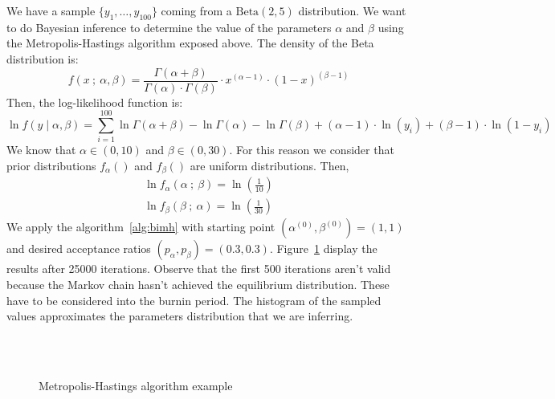 \documentclass[11pt,fleqn]{book} %
\begin{document}
\begin{example}
	We have a sample $\{y_1,\dots,y_{100}\}$ coming from a $\text{Beta}(2,5)$ 
	distribution. We want to do Bayesian inference to determine the value of the 
	parameters $\alpha$ and $\beta$ using the Metropolis-Hastings algorithm exposed 
	above. The density of the Beta distribution is:
	\begin{displaymath}
		f(x\ ;\ \alpha, \beta) = 
		\frac{\Gamma(\alpha+\beta)}{\Gamma(\alpha) \cdot \Gamma(\beta)} 
		\cdot x^{(\alpha-1)} \cdot (1-x)^{(\beta-1)}
	\end{displaymath}
	Then, the log-likelihood function is:
	\begin{displaymath}
		\ln f(y \mid \alpha, \beta) = 
		\displaystyle \sum_{i=1}^{100} 
		\ln \Gamma(\alpha+\beta) - \ln \Gamma(\alpha) - \ln \Gamma(\beta) +
		(\alpha-1) \cdot \ln(y_i) + (\beta-1) \cdot \ln(1-y_i)
	\end{displaymath}
	We know that $\alpha \in (0,10)$ and $\beta \in (0,30)$. For this reason we 
	consider that prior distributions $f_{\alpha}()$ and $f_{\beta}()$ are 
	uniform distributions. Then,
	\begin{displaymath}
		\begin{array}{l}
			\ln f_{\alpha}(\alpha \ ;\ \beta) = \ln(\frac{1}{10})
			\\
			\ln f_{\beta}(\beta \ ;\ \alpha) = \ln(\frac{1}{30})
		\end{array}
	\end{displaymath}
	We apply the algorithm~\ref{alg:bimh} with starting point 
	$\left(\alpha^{(0)},\beta^{(0)}\right)=(1,1)$ and 
	desired acceptance ratios $(p_{\alpha},p_{\beta})=(0.3,0.3)$.
	Figure~\ref{fig:mhbd} display the results after 25000 iterations.
	Observe that the first 500 iterations aren't valid because the Markov 
	chain hasn't achieved the equilibrium distribution. These have to be 
	considered into the burnin period. The histogram of the sampled values
	approximates the parameters distribution that we are inferring.
	\begin{figure}[!ht]
		\centering
		\\
		\\
		\caption{Metropolis-Hastings algorithm example}
		\label{fig:mhbd}
	\end{figure}
\end{example}
\end{document}
